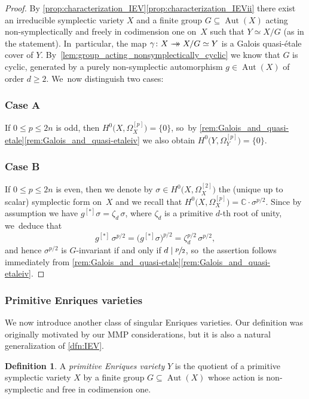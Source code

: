 \documentclass[JEP,XML,SOM,Unicode,published]{cedram}
\newcommand{\onto}{\mathchoice{\to\hspace*{-5mm}\to}{\mathrel{\hbox{$\to\hspace*{-2.85mm}\to$}}}{\to\hspace*{-3mm}\to}{\to\hspace*{-3mm}\to}}
\theoremstyle{plain}
\theoremstyle{definition}
\newtheorem{dfn}[thm]{Definition}
\newcommand{\C}{\mathbb{C}}
\DeclareMathOperator{\Aut}{Aut}
\begin{document}
\begin{proof}
By \autoref{prop:characterization_IEV}\eqref{prop:characterization_IEVii} there exist an irreducible symplectic variety $X$ and a finite group $G \subseteq \Aut(X)$ acting non-symplectically and freely in codimension one on~$X$ such that $Y \simeq X/G$ (as in the statement). In~particular, the map $\gamma \colon X \onto X/G \simeq Y$ is a Galois quasi-étale cover of $Y$. By~\autoref{lem:group_acting_nonsymplectically_cyclic} we know that $G$ is cyclic, generated by a purely non-symplectic automorphism $g \in \Aut(X)$ of order $d \geq 2$. We~now distinguish two cases:

\subsubsection*{Case A}
If $0 \leq p \leq 2n$ is odd, then $H^0 \bigl(X, \Omega_X^{[p]} \bigr) = \{ 0 \}$, so~by \autoref{rem:Galois_and_quasi-etale}\eqref{rem:Galois_and_quasi-etaleiv} we also obtain $H^0 \bigl(Y, \Omega_Y^{[p]} \bigr) = \{ 0 \}$.

\subsubsection*{Case B}
If $0 \leq p \leq 2n$ is even, then we denote by $\sigma \in H^0 \bigl(X, \Omega_X^{[2]} \bigr)$ the (unique up to scalar) symplectic form on~$X$ and we recall that $H^0 \bigl(X, \Omega_X^{[p]} \bigr) = \C \cdot \sigma^{p/2}$. Since by assumption we have $g^{[*]} \sigma = \zeta_d \,\sigma$, where $\zeta_d$ is a primitive $d$-th root of unity, we~deduce that
\[
g^{[*]} \,\sigma^{p/2} = \bigl(g^{[*]} \sigma \bigr)^{p/2} = \zeta_d^{p/2} \,\sigma^{p/2},
\]
and hence $\sigma^{p/2}$ is $G$\nobreakdash-invariant if and only if $d \mid \sfrac{p}{2}$, so~the assertion follows immediately from \autoref{rem:Galois_and_quasi-etale}\eqref{rem:Galois_and_quasi-etaleiv}.
\end{proof}

\subsubsection{Primitive Enriques varieties}

We now introduce another class of singular Enriques varieties. Our definition was originally motivated by our MMP considerations, but it is also a natural generalization of \autoref{dfn:IEV}.

\begin{dfn}
\label{dfn:PEV}
A \emph{primitive Enriques variety} $Y$ is the quotient of a primitive symplectic variety $X$ by a finite group $G \subseteq \Aut(X)$ whose action is non-symplectic and free in codimension one.
\end{dfn}
\end{document}
